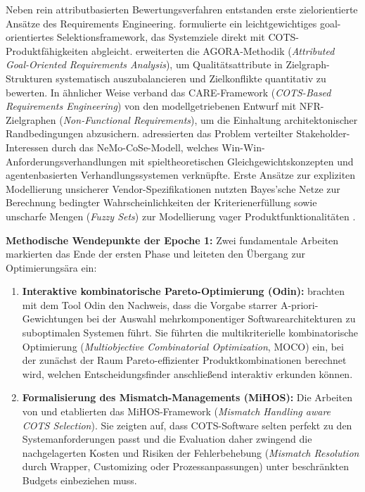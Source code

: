 Neben rein attributbasierten Bewertungsverfahren entstanden erste zielorientierte Ansätze des Requirements Engineering. \cite{TLB687YL} formulierte ein leichtgewichtiges goal-orientiertes Selektionsframework, das Systemziele direkt mit COTS-Produktfähigkeiten abgleicht. \cite{8XNYS4M9} erweiterten die AGORA-Methodik (\textit{Attributed Goal-Oriented Requirements Analysis}), um Qualitätsattribute in Zielgraph-Strukturen systematisch auszubalancieren und Zielkonflikte quantitativ zu bewerten. In ähnlicher Weise verband das CARE-Framework (\textit{COTS-Based Requirements Engineering}) von \cite{6RNULWVY} den modellgetriebenen Entwurf mit NFR-Zielgraphen (\textit{Non-Functional Requirements}), um die Einhaltung architektonischer Randbedingungen abzusichern. \cite{CZZ6XQZJ} adressierten das Problem verteilter Stakeholder-Interessen durch das NeMo-CoSe-Modell, welches Win-Win-Anforderungsverhandlungen mit spieltheoretischen Gleichgewichtskonzepten und agentenbasierten Verhandlungssystemen verknüpfte. Erste Ansätze zur expliziten Modellierung unsicherer Vendor-Spezifikationen nutzten Bayes'sche Netze zur Berechnung bedingter Wahrscheinlichkeiten der Kriterienerfüllung \cite{QDUNCXFC} sowie unscharfe Mengen (\textit{Fuzzy Sets}) zur Modellierung vager Produktfunktionalitäten \cite{CI86GRRG}.

\textbf{Methodische Wendepunkte der Epoche 1:}
Zwei fundamentale Arbeiten markierten das Ende der ersten Phase und leiteten den Übergang zur Optimierungsära ein:
\begin{enumerate}
    \item \textbf{Interaktive kombinatorische Pareto-Optimierung (Odin):} \cite{ZQMG69VT} brachten mit dem Tool Odin den Nachweis, dass die Vorgabe starrer A-priori-Gewichtungen bei der Auswahl mehrkomponentiger Softwarearchitekturen zu suboptimalen Systemen führt. Sie führten die multikriterielle kombinatorische Optimierung (\textit{Multiobjective Combinatorial Optimization}, MOCO) ein, bei der zunächst der Raum Pareto-effizienter Produktkombinationen berechnet wird, welchen Entscheidungsfinder anschließend interaktiv erkunden können.
    \item \textbf{Formalisierung des Mismatch-Managements (MiHOS):} Die Arbeiten von \cite{MC9UMXZZ} und \cite{9F79VAAB} etablierten das MiHOS-Framework (\textit{Mismatch Handling aware COTS Selection}). Sie zeigten auf, dass COTS-Software selten perfekt zu den Systemanforderungen passt und die Evaluation daher zwingend die nachgelagerten Kosten und Risiken der Fehlerbehebung (\textit{Mismatch Resolution} durch Wrapper, Customizing oder Prozessanpassungen) unter beschränkten Budgets einbeziehen muss.
\end{enumerate}

